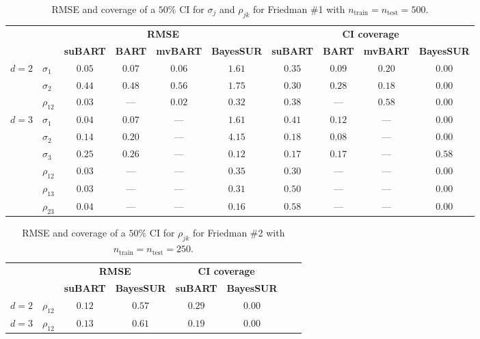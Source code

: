 \documentclass[aoas,preprint]{imsart}
\theoremstyle{plain}
\theoremstyle{definition}
\theoremstyle{remark}
\begin{document}
\begin{appendix}
\begin{table}[H]
\centering
\caption{RMSE and coverage of a $50\%$ CI for $\sigma_j$ and ${\rho}_{jk}$  for Friedman \#1 with $n_{\operatorname{train}} = n_{\operatorname{test}} =500$.}
\label{tab:sim_corr_fried_one_combined_500}
\begin{tabular}{llcccccccc}
\hline
\small
&& \multicolumn{4}{c}{\textbf{RMSE}} & \multicolumn{4}{c}{\textbf{CI coverage}} \\
& & \textbf{suBART} & \textbf{BART} & \textbf{mvBART} & \textbf{BayesSUR} & \textbf{suBART} & \textbf{BART} & \textbf{mvBART} & \textbf{BayesSUR} \\
\hline
\multirow{3}{*}{$d=2$}&{$\sigma_1$} & $0.05$ & $0.07$ & $0.06$ & $1.61$ & $0.35$ & $0.09$ & $0.20$ & $0.00$ \\
&{$\sigma_2$} & $0.44$ & $0.48$ & $0.56$ & $1.75$ & $0.30$ & $0.28$ & $0.18$ & $0.00$ \\
&{$\rho_{12}$} & $0.03$ & --- & $0.02$ & $0.32$ & $0.38$ & --- & $0.58$ & $0.00$ \\ 
\hline
\multirow{6}{*}{$d=3$}&{$\sigma_1$} & $0.04$ & $0.07$ & --- & $1.61$ & $0.41$ & $0.12$ & --- & $0.00$ \\
&{$\sigma_2$} & $0.14$ & $0.20$ & --- & $4.15$ & $0.18$ & $0.08$ & --- & $0.00$ \\
&{$\sigma_3$} & $0.25$ & $0.26$ & --- & $0.12$ & $0.17$ & $0.17$ & --- & $0.58$ \\
&{$\rho_{12}$} & $0.03$ & --- & --- & $0.35$ & $0.30$ & --- & --- & $0.00$ \\ 
&{$\rho_{13}$} & $0.03$ & --- & --- & $0.31$ & $0.50$ & --- & --- & $0.00$ \\
&{$\rho_{23}$} & $0.04$ & --- & --- & $0.16$ & $0.58$ & --- & --- & $0.00$ \\ 
\end{tabular}
\end{table}%
\begin{table}[H]
\centering
\caption{RMSE and coverage of a $50\%$ CI for ${\rho}_{jk}$ for Friedman \#2 with $n_{\operatorname{train}} = n_{\operatorname{test}} = 250$.}
\label{tab:sim_corr_class_fried_one_combined_250}
\begin{tabular}{llcccccc}
\hline
\small
& & \multicolumn{2}{c}{\textbf{RMSE}} & \multicolumn{2}{c}{\textbf{CI coverage}} \\
& & \textbf{suBART} & \textbf{BayesSUR} & \textbf{suBART} & \textbf{BayesSUR} \\
\hline
$d=2$&{$\rho_{12}$} & $0.12$ & $0.57$ & $0.29$ & $0.00$ \\ 
\hline
\multirow{3}{*}{$d=3$}&{$\rho_{12}$} & $0.13$ & $0.61$ & $0.19$ & $0.00$ \\

\end{tabular}
\end{table}
\end{appendix}
\end{document}
